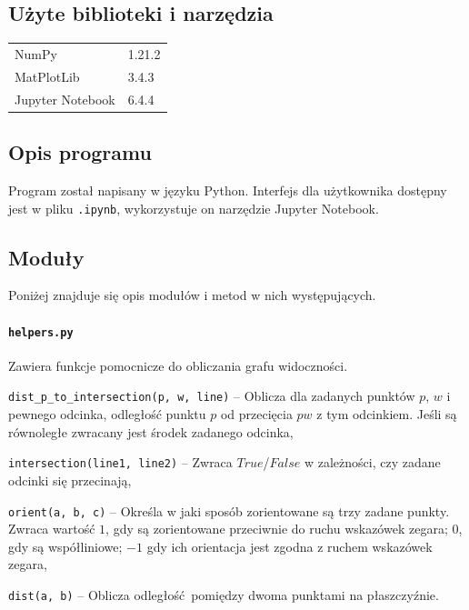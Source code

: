 \documentclass[12pt]{article}
\let\tempone\itemize
\let\temptwo\enditemize
\renewenvironment{itemize}{\tempone\setlength{\itemsep}{0cm}}{\temptwo}
\begin{document}
	\subsection{Użyte biblioteki i narzędzia}
		\begin{tabular}{l|l}
			NumPy&1.21.2\\
			MatPlotLib&3.4.3\\
			Jupyter Notebook&6.4.4
		\end{tabular}
	
	\subsection{Opis programu}
		Program został napisany w języku Python. Interfejs dla użytkownika dostępny jest w pliku \lstinline|.ipynb|, wykorzystuje on narzędzie Jupyter Notebook.
	
	\subsection{Moduły}
		Poniżej znajduje się opis modułów i metod w nich występujących.
	
	\paragraph{\lstinline|helpers.py|}
		Zawiera funkcje pomocnicze do obliczania grafu widoczności.
		\begin{itemize}
			\item \lstinline|dist_p_to_intersection(p, w, line)| -- Oblicza dla zadanych punktów $ p $, $ w $ i pewnego odcinka, odległość punktu $ p $ od przecięcia $ pw $ z tym odcinkiem. Jeśli są równoległe zwracany jest środek zadanego odcinka,\\
			\item \lstinline|intersection(line1, line2)| -- Zwraca $ True $/$ False $ w zależności, czy zadane odcinki się przecinają,\\
			\item \lstinline|orient(a, b, c)| -- Określa w jaki sposób zorientowane są trzy zadane punkty. Zwraca wartość $ 1 $, gdy są zorientowane przeciwnie do ruchu wskazówek zegara; $ 0 $, gdy są współliniowe; $ -1 $ gdy ich orientacja jest zgodna z ruchem wskazówek zegara,\\
			\item \lstinline|dist(a, b)| -- Oblicza odległość pomiędzy dwoma punktami na płaszczyźnie.
		\end{itemize}
	
\end{document}
